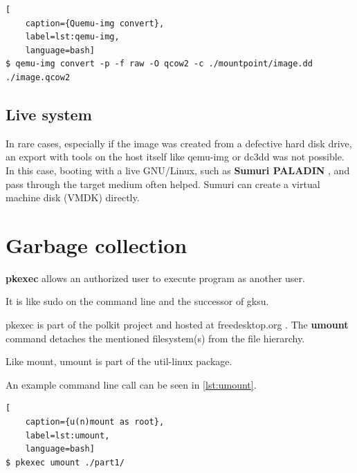 \begin{lstlisting}[
    caption={Quemu-img convert},
    label=lst:qemu-img,
    language=bash]
$ qemu-img convert -p -f raw -O qcow2 -c ./mountpoint/image.dd ./image.qcow2
\end{lstlisting}

\subsection{Live system}

In rare cases, especially if the image was created from a defective hard disk drive, an export with tools on the host itself like qemu-img or dc3dd was not possible.
In this case, booting with a live GNU/Linux, such as \textbf{Sumuri PALADIN} \cite{Paladin}, and pass through the target medium often helped. Sumuri can create a virtual machine disk (VMDK) directly.

\section{Garbage collection}

\textbf{pkexec} allows an authorized user to execute program as another user.

It is like sudo on the command line and the successor of gksu.

pkexec is part of the polkit project and hosted at freedesktop.org \cite{Polkit}.\newline
\newline
\noindent The \textbf{umount} command detaches the mentioned filesystem(s) from the file hierarchy.

Like mount, umount is part of the util-linux package.

An example command line call can be seen in \cref{lst:umount}.

\begin{lstlisting}[
    caption={u(n)mount as root},
    label=lst:umount,
    language=bash]
$ pkexec umount ./part1/
\end{lstlisting}